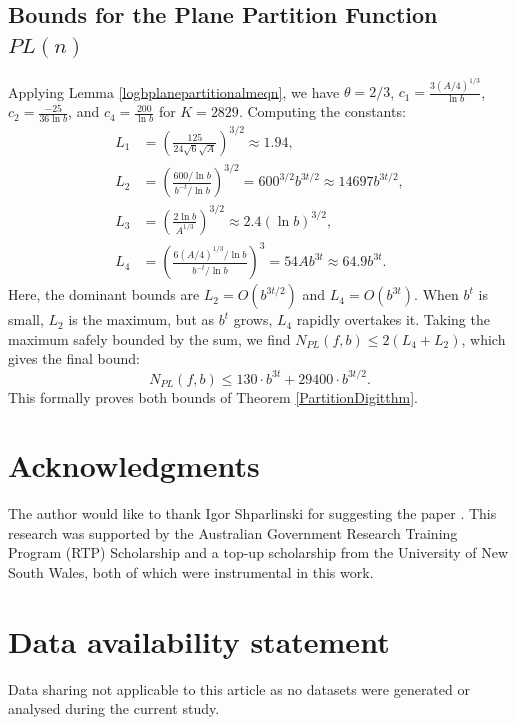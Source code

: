 \documentclass[12pt]{amsart}
\numberwithin{equation}{section}
\begin{document}
\subsection{Bounds for the Plane Partition Function $PL(n)$}
Applying Lemma \ref{logbplanepartitionalmeqn}, we have $\theta = 2/3$, $c_1 = \frac{3(A/4)^{1/3}}{\ln b}$, $c_2 = \frac{-25}{36 \ln b}$, and $c_4 = \frac{200}{\ln b}$ for $K=2829$. Computing the constants:
\begin{align*}
L_{1} &= \left(\frac{125}{24\sqrt{6}\sqrt{A}}\right)^{3/2} \approx 1.94, \\
L_{2} &= \left(\frac{600/\ln b}{b^{-t}/\ln b}\right)^{3/2} = 600^{3/2} b^{3t/2} \approx 14697 b^{3t/2}, \\
L_{3} &= \left(\frac{2 \ln b}{A^{1/3}}\right)^{3/2} \approx 2.4 (\ln b)^{3/2}, \\
L_{4} &= \left(\frac{6 (A/4)^{1/3} / \ln b}{b^{-t}/\ln b}\right)^3 = 54A b^{3t} \approx 64.9 b^{3t}.
\end{align*}
Here, the dominant bounds are $L_2 = O(b^{3t/2})$ and $L_4 = O(b^{3t})$. When $b^t$ is small, $L_2$ is the maximum, but as $b^t$ grows, $L_4$ rapidly overtakes it. Taking the maximum safely bounded by the sum, we find $N_{PL}(f,b) \le 2(L_4 + L_2)$, which gives the final bound:
\begin{equation*}
N_{PL}(f,b) \leq 130 \cdot b^{3t} + 29400 \cdot b^{3t/2}.
\end{equation*}
This formally proves both bounds of Theorem \ref{PartitionDigitthm}.

\section*{Acknowledgments}
The author would like to thank Igor Shparlinski for suggesting the paper \cite{LucaPart2}. This research was supported by the Australian Government Research Training Program (RTP) Scholarship and a top-up scholarship from the University of New South Wales, both of which were instrumental in this work.
\section*{Data availability statement}
Data sharing not applicable to this article as no datasets were generated or analysed during the current study.
\end{document}

